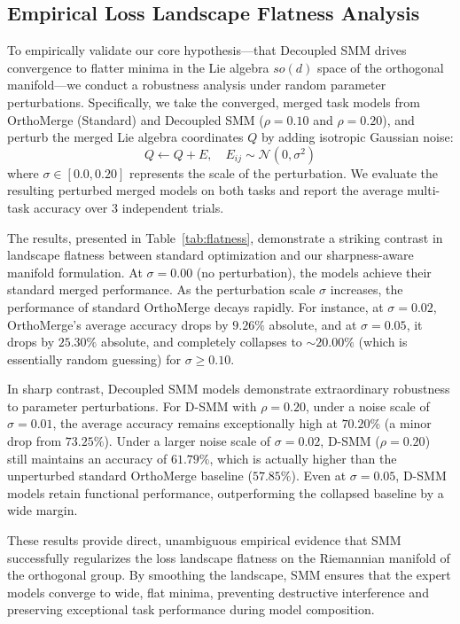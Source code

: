 \documentclass{article}
\theoremstyle{plain}
\theoremstyle{definition}
\theoremstyle{remark}
\begin{document}
\subsection{Empirical Loss Landscape Flatness Analysis}
\label{sec:flatness}
To empirically validate our core hypothesis---that Decoupled SMM drives convergence to flatter minima in the Lie algebra $so(d)$ space of the orthogonal manifold---we conduct a robustness analysis under random parameter perturbations. Specifically, we take the converged, merged task models from OrthoMerge (Standard) and Decoupled SMM ($\rho = 0.10$ and $\rho = 0.20$), and perturb the merged Lie algebra coordinates $Q$ by adding isotropic Gaussian noise:
\begin{equation}
    Q \leftarrow Q + E, \quad E_{ij} \sim \mathcal{N}(0, \sigma^2)
\end{equation}
where $\sigma \in [0.0, 0.20]$ represents the scale of the perturbation. We evaluate the resulting perturbed merged models on both tasks and report the average multi-task accuracy over 3 independent trials.

The results, presented in Table~\ref{tab:flatness}, demonstrate a striking contrast in landscape flatness between standard optimization and our sharpness-aware manifold formulation.
At $\sigma = 0.00$ (no perturbation), the models achieve their standard merged performance. As the perturbation scale $\sigma$ increases, the performance of standard OrthoMerge decays rapidly. For instance, at $\sigma = 0.02$, OrthoMerge's average accuracy drops by $9.26\%$ absolute, and at $\sigma = 0.05$, it drops by $25.30\%$ absolute, and completely collapses to $\sim 20.00\%$ (which is essentially random guessing) for $\sigma \geq 0.10$.

In sharp contrast, Decoupled SMM models demonstrate extraordinary robustness to parameter perturbations. For D-SMM with $\rho = 0.20$, under a noise scale of $\sigma = 0.01$, the average accuracy remains exceptionally high at $70.20\%$ (a minor drop from $73.25\%$). Under a larger noise scale of $\sigma = 0.02$, D-SMM ($\rho = 0.20$) still maintains an accuracy of $61.79\%$, which is actually higher than the unperturbed standard OrthoMerge baseline ($57.85\%$). Even at $\sigma = 0.05$, D-SMM models retain functional performance, outperforming the collapsed baseline by a wide margin.

These results provide direct, unambiguous empirical evidence that SMM successfully regularizes the loss landscape flatness on the Riemannian manifold of the orthogonal group. By smoothing the landscape, SMM ensures that the expert models converge to wide, flat minima, preventing destructive interference and preserving exceptional task performance during model composition.
\end{document}
